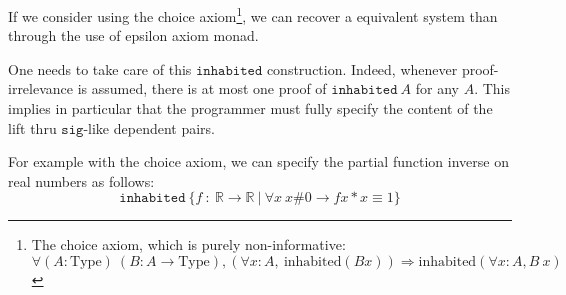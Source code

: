 \documentclass[a4paper,11pt]{article}
\newcommand{\R}{\mathbb{R}}
\newcommand{\Type}{\mbox{Type}}
\theoremstyle{definition}
\theoremstyle{remark}
\begin{document}
  
  If we consider using the choice axiom\footnote{The choice axiom, which is purely non-informative:\\$\forall (A:\Type)\ (B:A→\Type), (\forall x:A,\ \mbox{inhabited}(B x)) \Rightarrow \mbox{inhabited}(\forall x:A, B~x)$}, we can recover a equivalent system than through the use of epsilon axiom monad.
  

  One needs to take care of this $\mathtt{inhabited}$ construction. Indeed, whenever proof-irrelevance is assumed, there is at most one proof of $\mathtt{inhabited}\ A$ for any $A$. This implies in particular that the programmer must fully specify the content of the lift thru $\mathtt{sig}$-like dependent pairs.

  For example with the choice axiom, we can specify the partial function inverse on real numbers as follows:
  $$\mathtt{inhabited}\ \{f\ :\ \R → \R\ |\ \forall x\ x \# 0 → f x * x ≡ 1\}$$

  
  
\end{document}
